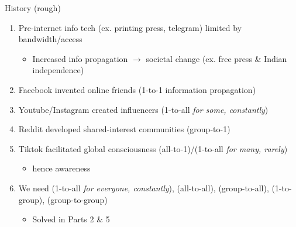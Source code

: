 \documentclass[aspectratio=169]{beamer}
\begin{document}
\begin{frame}{History (rough)}
\vspace{-0.6in}
\begin{enumerate}
    \item Pre-internet info tech (ex. printing press, telegram) limited by bandwidth/access
        \begin{itemize}
            \item Increased info propagation $\rightarrow$ societal change (ex. free press \& Indian independence)
        \end{itemize}
    \item Facebook invented online friends (1-to-1 information propagation)
    \item Youtube/Instagram created influencers (1-to-all \textit{for some, constantly})
    \item Reddit developed shared-interest communities (group-to-1)
    \item Tiktok facilitated global consciousness (all-to-1)/(1-to-all \textit{for many, rarely})
    \begin{itemize}
        \item hence  awareness
    \end{itemize}
    \item We need (1-to-all \textit{for everyone, constantly}), (all-to-all), (group-to-all), (1-to-group), (group-to-group)
    \begin{itemize}
        \item Solved in Parts 2 \& 5
    \end{itemize}
\end{enumerate}
\end{frame}
\end{document}
